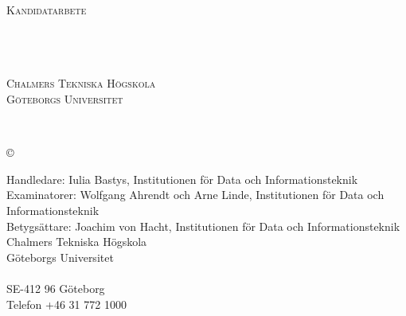\newpage
\thispagestyle{empty}
\begin{center}

    \textsc{\large Kandidatarbete \the\year{} }\\[4cm]

    \textbf{\Large \ambaTitleNewLine} \\[1cm]

    {\linespread{1.2}\large
    \StrSubstitute{\ambaAuthors}{,}{\\}
    \\ %
    }

    \vfill

    \ambaDepartmentSwedish{} \\
    \textsc{Chalmers Tekniska Högskola} \\
    \textsc{Göteborgs Universitet} \\
    \ambaCityCountryYearSwedish{}
\end{center}


\newpage
{\ambaTitle}\\
{\ambaAuthors}
\setlength{\parskip}{0.5cm}
\vspace{1cm}

\copyright{~{\ambaAuthors{} \the\year}}
\setlength{\parskip}{1cm}

Handledare: Iulia Bastys, Institutionen för Data och Informationsteknik \\
Examinatorer: Wolfgang Ahrendt och Arne Linde, Institutionen för Data och Informationsteknik \\
Betygsättare: Joachim von Hacht, Institutionen för Data och Informationsteknik \\[1cm]

Chalmers Tekniska Högskola\\
Göteborgs Universitet\\
\ambaDepartmentSwedish{} \\
SE-412 96 Göteborg\\
Telefon +46 31 772 1000 \setlength{\parskip}{0.5cm}

\vfill
\ambaCityCountryYearSwedish{}
